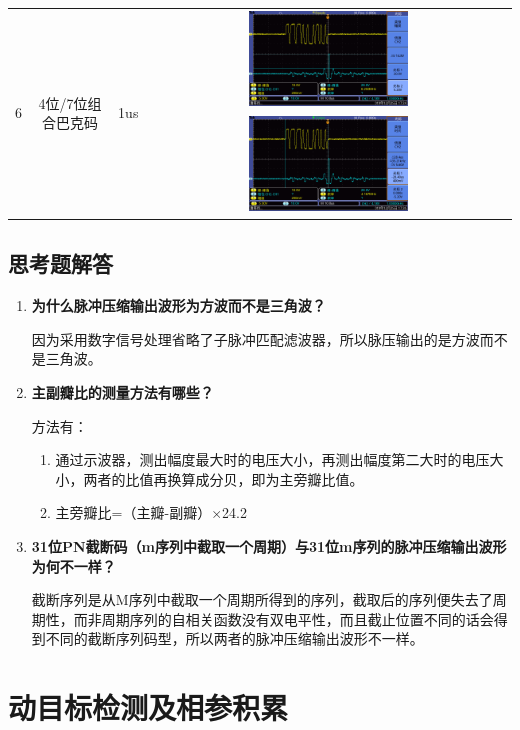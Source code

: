 \documentclass[12pt]{article}
\begin{document}
\begin{longtable}{|c|c|c|c|}
    \hline
    \multirow{2}[4]{*}{6} & \multirow{2}[4]{*}{4位/7位组合巴克码} & \multirow{2}[4]{*}{1us} &\includegraphics[width=0.45\textwidth]{data/new/F0041TEK}  \\
      &&&\includegraphics[width=0.45\textwidth]{data/new/F0042TEK}\\
    \hline
\end{longtable}
\subsection{思考题解答}
\begin{enumerate}
  \item \textbf{为什么脉冲压缩输出波形为方波而不是三角波？}\par
因为采用数字信号处理省略了子脉冲匹配滤波器，所以脉压输出的是方波而不是三角波。
\item \textbf{主副瓣比的测量方法有哪些？}\par
方法有：
\begin{enumerate}[(1).]
  \item 通过示波器，测出幅度最大时的电压大小，再测出幅度第二大时的电压大小，两者的比值再换算成分贝，即为主旁瓣比值。
 \item 主旁瓣比=（主瓣-副瓣）$\times$24.2
\end{enumerate}
\item \textbf{31位PN截断码（m序列中截取一个周期）与31位m序列的脉冲压缩输出波形为何不一样？}\par
截断序列是从M序列中截取一个周期所得到的序列，截取后的序列便失去了周期性，而非周期序列的自相关函数没有双电平性，而且截止位置不同的话会得到不同的截断序列码型，所以两者的脉冲压缩输出波形不一样。
\end{enumerate}
\newpage
\section{动目标检测及相参积累}
\setcounter{equation}{0}
\setcounter{table}{0}
\setcounter{figure}{0}
\end{document}

